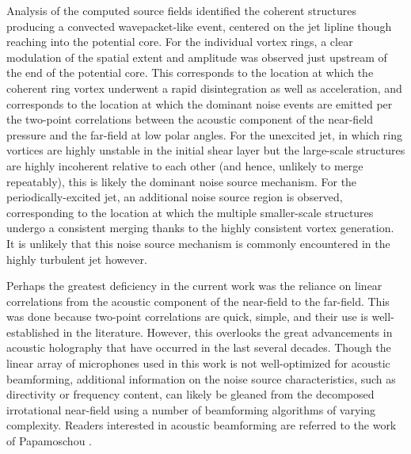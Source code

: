 Analysis of the computed source fields identified the coherent structures producing a convected wavepacket-like event, centered on the jet lipline though reaching into the potential core.
For the individual vortex rings, a clear modulation of the spatial extent and amplitude was observed just upstream of the end of the potential core.
This corresponds to the location at which the coherent ring vortex underwent a rapid disintegration as well as acceleration, and corresponds to the location at which the dominant noise events are emitted per the two-point correlations between the acoustic component of the near-field pressure and the far-field at low polar angles.
For the unexcited jet, in which ring vortices are highly unstable in the initial shear layer but the large-scale structures are highly incoherent relative to each other (and hence, unlikely to merge repeatably), this is likely the dominant noise source mechanism. 
For the periodically-excited jet, an additional noise source region is observed, corresponding to the location at which the multiple smaller-scale structures undergo a consistent merging thanks to the highly consistent vortex generation.
It is unlikely that this noise source mechanism is commonly encountered in the highly turbulent jet however.

Perhaps the greatest deficiency in the current work was the reliance on linear correlations from the acoustic component of the near-field to the far-field.
This was done because two-point correlations are quick, simple, and their use is well-established in the literature.
However, this overlooks the great advancements in acoustic holography that have occurred in the last several decades.
Though the linear array of microphones used in this work is not well-optimized for acoustic beamforming, additional information on the noise source characteristics, such as directivity or frequency content, can likely be gleaned from the decomposed irrotational near-field using a number of beamforming algorithms of varying complexity.
Readers interested in acoustic beamforming are referred to the work of Papamoschou \citep{Papamoschou2011}.